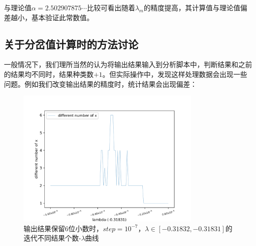 \documentclass[a4paper,11pt]{article}
\begin{document}
\begin{table}[!htbp]
\centering
{}
\caption{$\lambda > 0$时的Feigenbaum常数$\alpha$计算结果}
\end{table}

与理论值$\alpha = 2.502 907 875\cdots$比较可看出随着$\lambda_{m}$的精度提高，其计算值与理论值偏差越小，基本验证此常数值。



\subsection{关于分岔值计算时的方法讨论}
一般情况下，我们理所当然的认为将输出结果输入到分析脚本中，判断结果和之前的结果均不同时，结果种类数$+1$。但实际操作中，发现这样处理数据会出现一些问题。例如我们改变输出结果的精度时，统计结果会出现偏差：

\begin{figure}[!htbp]        
\centering
\includegraphics[bb= 0 0 450 370,width=9cm]{7-6.png}      
\caption{输出结果保留6位小数时，$step = 10^{-7}$，$\lambda \in [-0.31832,-0.31831]$的迭代不同结果个数-$\lambda$曲线}      
\end{figure}
\end{document}

